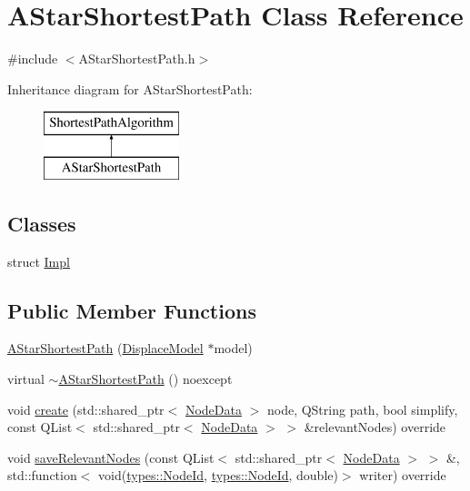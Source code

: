 \hypertarget{class_a_star_shortest_path}{}\section{A\+Star\+Shortest\+Path Class Reference}
\label{class_a_star_shortest_path}


{\ttfamily \#include $<$A\+Star\+Shortest\+Path.\+h$>$}

Inheritance diagram for A\+Star\+Shortest\+Path\+:\begin{figure}[H]
\begin{center}
\leavevmode
\includegraphics[height=2.000000cm]{d8/db2/class_a_star_shortest_path}
\end{center}
\end{figure}
\subsection*{Classes}
\begin{DoxyCompactItemize}
\item 
struct \mbox{\hyperlink{struct_a_star_shortest_path_1_1_impl}{Impl}}
\end{DoxyCompactItemize}
\subsection*{Public Member Functions}
\begin{DoxyCompactItemize}
\item 
\mbox{\hyperlink{class_a_star_shortest_path_afe362346b5e39ab702e89bcf079c4537}{A\+Star\+Shortest\+Path}} (\mbox{\hyperlink{class_displace_model}{Displace\+Model}} $\ast$model)
\item 
virtual \mbox{\hyperlink{class_a_star_shortest_path_a5046a33b9e06768ed137af672e995e03}{$\sim$\+A\+Star\+Shortest\+Path}} () noexcept
\item 
void \mbox{\hyperlink{class_a_star_shortest_path_a4df475e3ab2c828313160ab940e7e4f3}{create}} (std\+::shared\+\_\+ptr$<$ \mbox{\hyperlink{class_node_data}{Node\+Data}} $>$ node, Q\+String path, bool simplify, const Q\+List$<$ std\+::shared\+\_\+ptr$<$ \mbox{\hyperlink{class_node_data}{Node\+Data}} $>$ $>$ \&relevant\+Nodes) override
\item 
void \mbox{\hyperlink{class_a_star_shortest_path_ac75bc0ce3b80510e0f3170cb717c620c}{save\+Relevant\+Nodes}} (const Q\+List$<$ std\+::shared\+\_\+ptr$<$ \mbox{\hyperlink{class_node_data}{Node\+Data}} $>$ $>$ \&, std\+::function$<$ void(\mbox{\hyperlink{classtypes_1_1_node_id}{types\+::\+Node\+Id}}, \mbox{\hyperlink{classtypes_1_1_node_id}{types\+::\+Node\+Id}}, double)$>$ writer) override
\end{DoxyCompactItemize}



